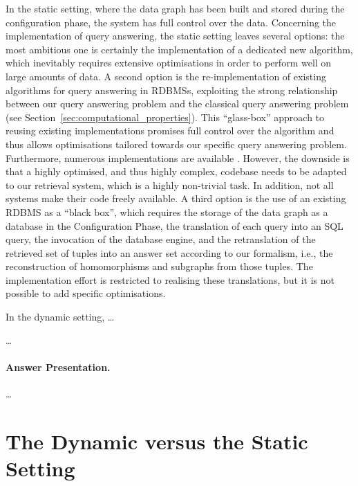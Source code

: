 In the static setting, where the data graph has been built and stored during the
configuration phase, the system has full control over the data.
Concerning the implementation of query answering,
the static setting leaves several options:
the most ambitious one is certainly the implementation of a dedicated new
algorithm, which inevitably requires extensive optimisations in order to perform
well on large amounts of data.
A second option is the re-implementation of existing algorithms
for query answering in \glspl{RDBMS}, exploiting the strong relationship
between our query answering problem and the classical query answering problem
(see Section~\ref{sec:computational_properties}).
This \enquote{glass-box} approach to reusing existing implementations promises
full control over the algorithm and thus allows optimisations tailored
towards our specific query answering problem.
Furthermore, numerous implementations are available \autocite[cf.][]{WikiSQLRDBMSs}.
However, the downside is that a highly optimised, and thus highly complex,
codebase needs to be adapted to our retrieval system, which is a
highly non-trivial task. In addition, not all systems make their code freely available.
A third option is the use of an existing \gls{RDBMS} as a \enquote{black box},
which requires the storage of the data graph as a database in the Configuration Phase,
the translation of each query into an SQL query,
the invocation of the database engine,
and the retranslation of the retrieved set of tuples
into an answer set according to our formalism, i.e.,
the reconstruction of homomorphisms and subgraphs from those tuples.
The implementation effort is restricted to realising these translations,
but it is not possible to add specific optimisations.

In the dynamic setting, \dots


\dots

\paragraph{Answer Presentation.}

\dots




\section{The Dynamic versus the Static Setting}
\label{sec:dynamic_vs_static}

